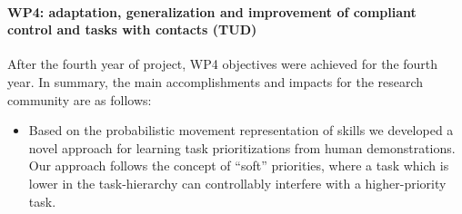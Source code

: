 

\paragraph*{WP4: adaptation, generalization and improvement of compliant control and tasks with contacts (TUD)}

After the fourth year of project, WP4 objectives were achieved for the fourth year. In summary, the main accomplishments and impacts for the research community are as follows: 


\begin{itemize}

\item Based on the probabilistic movement representation of skills we developed a novel approach for learning task prioritizations from human demonstrations. Our approach follows the concept of ``soft'' priorities, where a task which is lower in the task-hierarchy can controllably interfere with a higher-priority task. 

 \end{itemize}
